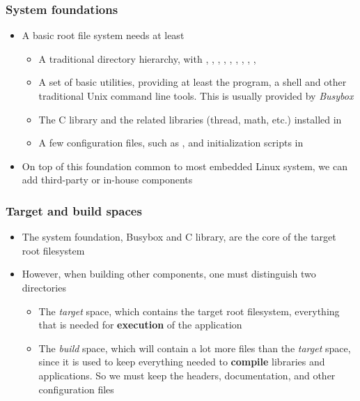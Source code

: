 \begin{frame}
  \frametitle{System foundations}
  \begin{itemize}
  \item A basic root file system needs at least
    \begin{itemize}
    \item A traditional directory hierarchy, with ,
      , , , ,
      , , ,
      , 
    \item A set of basic utilities, providing at least the 
      program, a shell and other traditional Unix command line
      tools. This is usually provided by {\em Busybox}
    \item The C library and the related libraries (thread, math, etc.)
      installed in 
    \item A few configuration files, such as , and
      initialization scripts in 
    \end{itemize}
  \item On top of this foundation common to most embedded Linux
    system, we can add third-party or in-house components
  \end{itemize}
\end{frame}

\begin{frame}
  \frametitle{Target and build spaces}
  \begin{itemize}
  \item The system foundation, Busybox and C library, are the core of
    the target root filesystem
  \item However, when building other components, one must distinguish
    two directories
    \begin{itemize}
    \item The {\em target} space, which contains the target root
      filesystem, everything that is needed for {\bf execution} of the
      application
    \item The {\em build} space, which will contain a lot more files
      than the {\em target} space, since it is used to keep everything
      needed to {\bf compile} libraries and applications. So we must
      keep the headers, documentation, and other configuration files
    \end{itemize}
  \end{itemize}
\end{frame}


